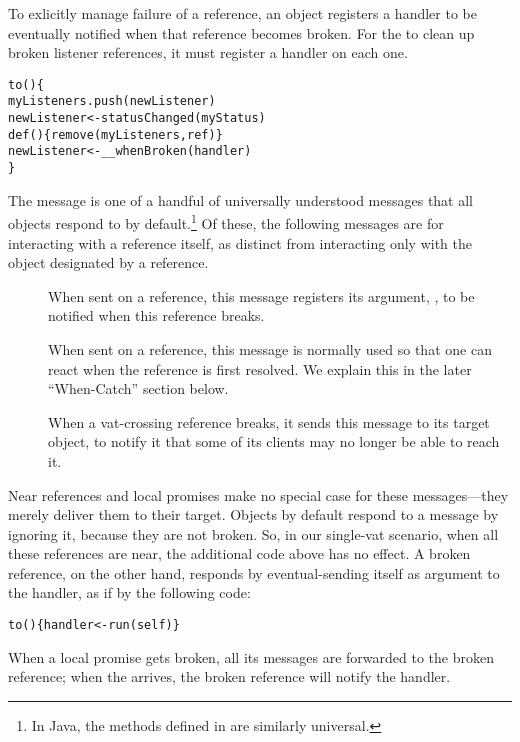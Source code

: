 \documentclass{llncs}
\begin{document}
To exlicitly manage failure of a reference, an object registers a
handler to be eventually notified when that reference becomes
broken. For the  to clean up broken listener
references, it must register a handler on each one.
% 
\begin{alltt}
    to () \{
        myListeners.push(newListener)
        newListener <- statusChanged(myStatus)
        def () \{ remove(myListeners, ref) \}
        newListener <- \_\_whenBroken(handler)
    \}
\end{alltt}
%
The  message is one of a handful of universally
understood messages that all objects respond to by default.\footnote{
%
In Java, the methods defined in  are similarly
universal.}
%
Of these, the following messages are for interacting with a reference
itself, as distinct from interacting only with the object designated
by a reference.
%
\begin{description}
\item[] When sent on a reference,
  this message registers its argument, , to be notified
  when this reference breaks.
\item[] When sent on a
  reference, this message is normally used so that one can react when
  the reference is first resolved. We explain this in the later
  ``When-Catch'' section below.
\item[] When a
  vat-crossing reference breaks, it sends this message to its target
  object, to notify it that some of its clients may no longer be able
  to reach it.
\end{description}
%
Near references and local promises make no special case for these
messages---they merely deliver them to their target. Objects by
default respond to a  message by ignoring it,
because they are not broken. So, in our single-vat scenario, when all
these references are near, the additional code above has no effect. A
broken reference, on the other hand, responds by eventual-sending
itself as argument to the handler, as if by the following code:
%
\begin{alltt}
    to () \{ handler <- run(self) \}
\end{alltt}
%
When a local promise gets broken, all its messages are forwarded to
the broken reference; when the  arrives, the
broken reference will notify the handler.
\end{document}

